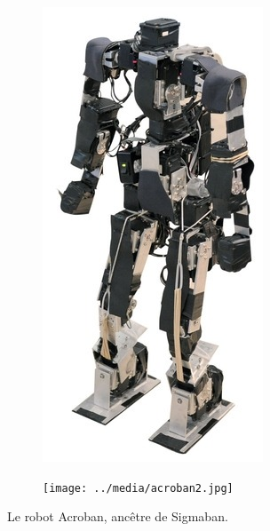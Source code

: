 \begin{figure}[htb]
    \centerfloat
    \begin{subfigure}{0.3\paperwidth}
        \centering
        \includegraphics[width=0.7\linewidth]{../media/acroban.jpg}
    \end{subfigure}
    \begin{subfigure}{0.3\paperwidth}
        \centering
        \texttt{[image: ../media/acroban2.jpg]}
    \end{subfigure}
    \caption{\label{fig:robot_acroban} 
        Le robot Acroban, ancêtre de Sigmaban.
    }
\end{figure}

